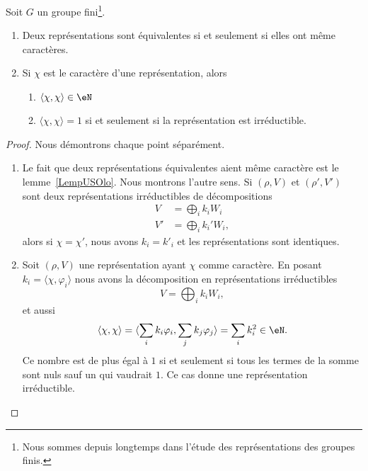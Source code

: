 \begin{theorem} \label{ThoWGkfADd}
    Soit \( G\) un groupe fini\footnote{Nous sommes depuis longtemps dans l'étude des représentations des groupes finis.}.
    \begin{enumerate}
        \item   \label{ItemZReOWoHi}
            Deux représentations sont équivalentes si et seulement si elles ont même caractères.
        \item   \label{ItemZReOWoHii}
            Si \( \chi\) est le caractère d'une représentation, alors
            \begin{enumerate}
                \item
                    \( \langle \chi, \chi\rangle \in \eN\)
                \item
                    \( \langle \chi, \chi\rangle =1\) si et seulement si la représentation est irréductible.
            \end{enumerate}
    \end{enumerate}
\end{theorem}

\begin{proof}
    Nous démontrons chaque point séparément.
    \begin{enumerate}
        \item

    Le fait que deux représentations équivalentes aient même caractère est le lemme~\ref{LempUSOlo}. Nous montrons l'autre sens. Si \( (\rho,V)\) et \( (\rho',V')\) sont deux représentations irréductibles de décompositions
    \begin{subequations}
        \begin{align}
            V&=\bigoplus_ik_iW_i\\
            V'&=\bigoplus_ik_i'W_i,
        \end{align}
    \end{subequations}
    alors si \( \chi=\chi'\), nous avons \( k_i=k'_i\) et les représentations sont identiques.

\item

    Soit \( (\rho,V)\) une représentation ayant \( \chi\) comme caractère. En posant \( k_i=\langle \chi, \varphi_i\rangle \) nous avons la décomposition en représentations irréductibles
    \begin{equation}
        V=\bigoplus_ik_iW_i,
    \end{equation}
    et aussi
    \begin{equation}
        \langle \chi, \chi\rangle =\langle \sum_ik_i\varphi_i, \sum_jk_j\varphi_j\rangle =\sum_ik_i^2\in \eN.
    \end{equation}
    Ce nombre est de plus égal à \( 1\) si et seulement si tous les termes de la somme sont nuls sauf un qui vaudrait \( 1\). Ce cas donne une représentation irréductible.

    \end{enumerate}

\end{proof}

